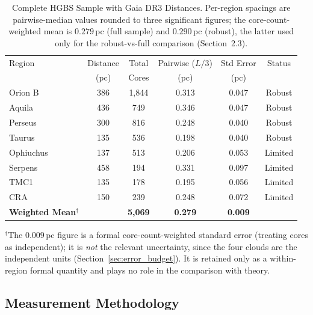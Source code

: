 \documentclass[usenatbib,twoside,twocolumn]{mnras}
\begin{document}
\begin{table}
\caption{Complete HGBS Sample with Gaia DR3 Distances. Per-region spacings are pairwise-median values rounded to three significant figures; the core-count-weighted mean is $0.279$\,pc (full sample) and $0.290$\,pc (robust), the latter used only for the robust-vs-full comparison (Section~2.3).}
\label{tab:sample}
\begin{tabular}{lccccc}
\toprule
Region & Distance & Total & Pairwise ($L/3$) & Std Error & Status \\
       & (pc)   & Cores & (pc)   & (pc)      &  \\
\midrule
Orion B  & 386 & 1,844 & 0.313 & 0.047 & Robust \\
Aquila   & 436 & 749   & 0.346 & 0.047 & Robust \\
Perseus  & 300 & 816   & 0.248 & 0.040 & Robust \\
Taurus   & 135 & 536   & 0.198 & 0.040 & Robust \\
Ophiuchus& 137 & 513   & 0.206 & 0.053 & Limited \\
Serpens  & 458 & 194   & 0.331 & 0.097 & Limited \\
TMC1     & 135 & 178   & 0.195 & 0.056 & Limited \\
CRA      & 150 & 239   & 0.248 & 0.072 & Limited \\
\midrule
\textbf{Weighted Mean}$^\dagger$ &  & \textbf{5,069} & \textbf{0.279} & \textbf{0.009} &  \\
\bottomrule
\end{tabular}
\par\vspace{2pt}
\footnotesize $^\dagger$The $0.009$\,pc figure is a formal core-count-weighted standard error (treating cores as independent); it is \emph{not} the relevant uncertainty, since the four clouds are the independent units (Section~\ref{sec:error_budget}). It is retained only as a within-region formal quantity and plays no role in the comparison with theory.
\end{table}

\subsection{Measurement Methodology}
\end{document}

